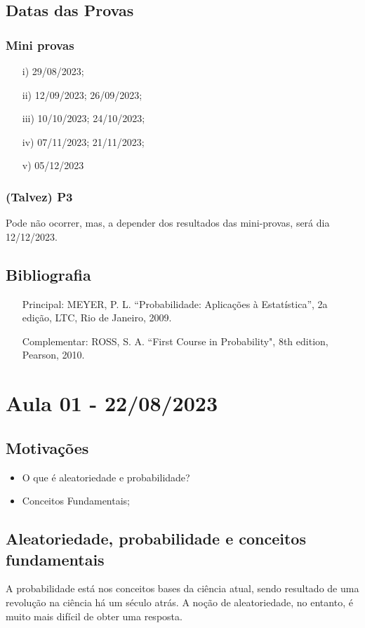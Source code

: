 \documentclass{article}
\begin{document}
\subsection*{Datas das Provas}
  \subsubsection*{Mini provas}
 \begin{itemize}
   \item[i)] 29/08/2023;
   \item[ii)] 12/09/2023; 26/09/2023;
   \item[iii)] 10/10/2023; 24/10/2023;
   \item[iv)] 07/11/2023; 21/11/2023;
   \item[v)] 05/12/2023
 \end{itemize}
 \subsubsection*{(Talvez) P3}
  Pode não ocorrer, mas, a depender dos resultados das mini-provas, será dia 12/12/2023.
\subsection*{Bibliografia}
\begin{itemize}
  \item[Principal:] MEYER, P. L. ``Probabilidade: Aplicações à Estatística'', 2a edição, LTC, Rio de Janeiro, 2009.
  \item[Complementar:] ROSS, S. A. ``First Course in Probability", 8th edition, Pearson, 2010.
\end{itemize}

 \newpage
\section{Aula 01 - 22/08/2023}
\subsection{Motivações}
\begin{itemize}
  \item O que é aleatoriedade e probabilidade?
  \item Conceitos Fundamentais;
\end{itemize}
\subsection{Aleatoriedade, probabilidade e conceitos fundamentais}
  A probabilidade está nos conceitos bases da ciência atual, sendo resultado de uma revolução na ciência há um século atrás.
A noção de aleatoriedade, no entanto, é muito mais difícil de obter uma resposta.
\end{document}
